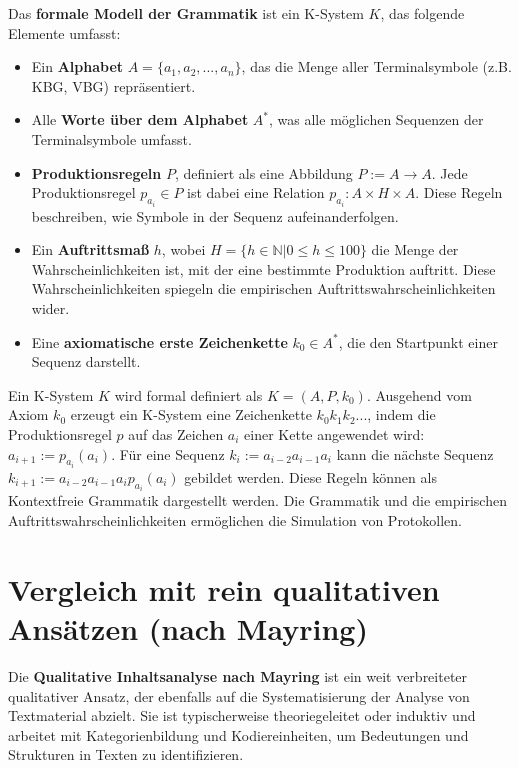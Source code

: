 \documentclass{article}
\begin{document}
Das \textbf{formale Modell der Grammatik} ist ein K-System $K$, das folgende Elemente umfasst:
\begin{itemize}
    \item Ein \textbf{Alphabet} $A=\{a_{1},a_{2},...,a_{n}\}$, das die Menge aller Terminalsymbole (z.B. KBG, VBG) repräsentiert.
    \item Alle \textbf{Worte über dem Alphabet} $A^{*}$, was alle möglichen Sequenzen der Terminalsymbole umfasst.
    \item \textbf{Produktionsregeln} $P$, definiert als eine Abbildung $P:=A\rightarrow A$. Jede Produktionsregel $p_{a_{i}}\in P$ ist dabei eine Relation $p_{a_{i}}:A\times H\times A$. Diese Regeln beschreiben, wie Symbole in der Sequenz aufeinanderfolgen.
    \item Ein \textbf{Auftrittsmaß} $h$, wobei $H=\{h\in \mathbb{N}|0\le h\le100\}$ die Menge der Wahrscheinlichkeiten ist, mit der eine bestimmte Produktion auftritt. Diese Wahrscheinlichkeiten spiegeln die empirischen Auftrittswahrscheinlichkeiten wider.
    \item Eine \textbf{axiomatische erste Zeichenkette} $k_{0}\in A^{*}$, die den Startpunkt einer Sequenz darstellt.
\end{itemize}
Ein K-System $K$ wird formal definiert als $K=(A,P,k_{0})$. Ausgehend vom Axiom $k_{0}$ erzeugt ein K-System eine Zeichenkette $k_{0}k_{1}k_{2}...$, indem die Produktionsregel $p$ auf das Zeichen $a_{i}$ einer Kette angewendet wird: $a_{i+1}:=p_{a_{i}}(a_{i})$. Für eine Sequenz $k_{i}:=a_{i-2}a_{i-1}a_{i}$ kann die nächste Sequenz $k_{i+1}:=a_{i-2}a_{i-1}a_{i}p_{a_{i}}(a_{i})$ gebildet werden. Diese Regeln können als Kontextfreie Grammatik dargestellt werden. Die Grammatik und die empirischen Auftrittswahrscheinlichkeiten ermöglichen die Simulation von Protokollen.

\section{Vergleich mit rein qualitativen Ansätzen (nach Mayring)}
Die \textbf{Qualitative Inhaltsanalyse nach Mayring} ist ein weit verbreiteter qualitativer Ansatz, der ebenfalls auf die Systematisierung der Analyse von Textmaterial abzielt. Sie ist typischerweise theoriegeleitet oder induktiv und arbeitet mit Kategorienbildung und Kodiereinheiten, um Bedeutungen und Strukturen in Texten zu identifizieren.
\end{document}
